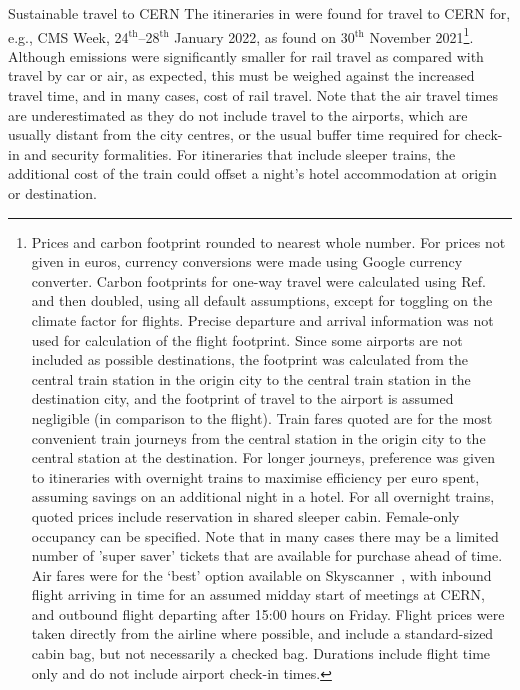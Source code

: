 \documentclass[../SustainableHEP.tex]{subfiles}
\begin{document}
\begin{casestudy}{Sustainable travel to CERN}%
The itineraries in  were found for travel to CERN for, e.g., CMS Week, 24$^\text{th}$--28$^\text{th}$ January 2022, as found on 30$^\text{th}$ November 2021\footnote{Prices and carbon footprint rounded to nearest whole number.  For prices not given in euros, currency conversions were made using Google currency converter.  Carbon footprints for one-way travel were calculated using Ref.~\cite{ecopassenger} and then doubled, using all default assumptions, except for toggling on the climate factor for flights.  Precise departure and arrival information was not used for calculation of the flight footprint.  Since some airports are not included as possible destinations, the footprint was calculated from the central train station in the origin city to the central train station in the destination city, and the footprint of travel to the airport is assumed negligible (in comparison to the flight).  Train fares quoted are for the most convenient train journeys from the central station in the origin city to the central station at the destination.  For longer journeys, preference was given to itineraries with overnight trains to maximise efficiency per euro spent, assuming savings on an additional night in a hotel.  For all overnight trains, quoted prices include reservation in shared sleeper cabin. Female-only occupancy can be specified. Note that in many cases there may be a limited number of 'super saver' tickets that are available for purchase ahead of time.  Air fares were for the ‘best’ option available on Skyscanner~\cite{skyscanner}, with inbound flight arriving in time for an assumed midday start of meetings at CERN, and outbound flight departing after 15:00 hours on Friday.  Flight prices were taken directly from the airline where possible, and include a standard-sized cabin bag, but not necessarily a checked bag.  Durations include flight time only and do not include airport check-in times.}.  Although emissions were significantly smaller for rail travel as compared with travel by car or air, as expected, this must be weighed against the increased travel time, and in many cases, cost of rail travel.  Note that the air travel times are underestimated as they do not include travel to the airports, which are usually distant from the city centres, or the usual buffer time required for check-in and security formalities.  For itineraries that include sleeper trains, the additional cost of the train could offset a night's hotel accommodation at origin or destination.
\end{casestudy}
\end{document}
